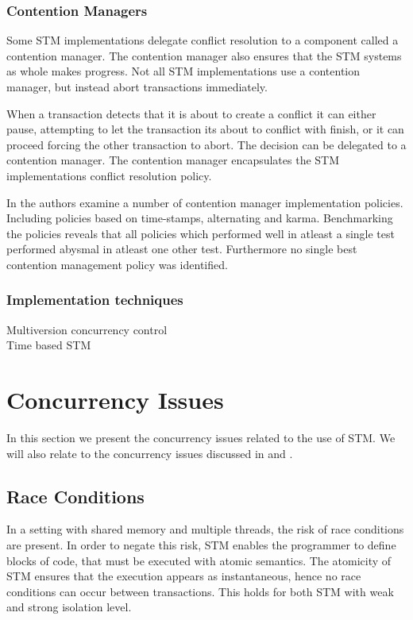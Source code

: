 \subsubsection{Contention Managers}
Some \ac{STM} implementations delegate conflict resolution to a component called a contention manager\cite[p. 2085]{herlihy2011tm}. The contention manager also ensures that the \ac{STM} systems as whole makes progress\cite[p. 1]{guerraoui2005toward}. Not all \ac{STM} implementations use a contention manager, but instead abort transactions immediately\cite[38]{riegel2013software}.

When a transaction detects that it is about to create a conflict it can either pause, attempting to let the transaction its about to conflict with finish, or it can proceed forcing the other transaction to abort. The decision can be delegated to a contention manager. The contention manager encapsulates the \ac{STM} implementations conflict resolution policy\cite[p. 2085]{herlihy2011tm}.

In \cite{scherer2004contention} the authors examine a number of contention manager implementation policies. Including policies based on time-stamps, alternating and karma. Benchmarking the policies reveals that all policies which performed well in atleast a single test performed abysmal in atleast one other test. Furthermore no single best contention management policy was identified.
\subsubsection{Implementation techniques}
Multiversion concurrency control\\
Time based STM\\


\section{Concurrency Issues}
In this section we present the concurrency issues related to the use of \ac{STM}. We will also relate to the concurrency issues discussed in  and .
\label{sec:stm_issues}

\subsection{Race Conditions}
In a setting with shared memory and multiple threads, the risk of race conditions are present. In order to negate this risk, \ac{STM} enables the programmer to define blocks of code, that must be executed with atomic semantics. The atomicity of \ac{STM} ensures that the execution appears as instantaneous, hence no race conditions can occur between transactions. This holds for both \ac{STM} with weak and strong isolation level.

